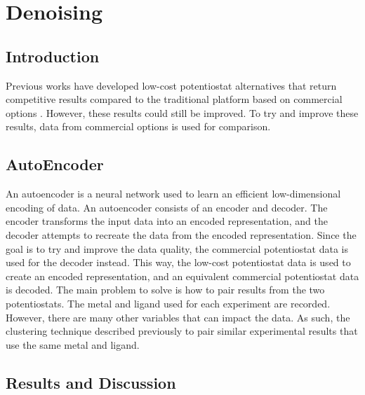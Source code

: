 \chapter{Denoising} \label{chap:chap-4}

\section{Introduction}
Previous works have developed low-cost potentiostat alternatives that return competitive results compared to the traditional platform based on commercial options \cite{PabloGarca2024}. However, these results could still be improved. To try and improve these results, data from commercial options is used for comparison. 
\section{AutoEncoder}
An autoencoder is a neural network used to learn an efficient low-dimensional encoding of data. An autoencoder consists of an encoder and decoder. The encoder transforms the input data into an encoded representation, and the decoder attempts to recreate the data from the encoded representation. Since the goal is to try and improve the data quality, the commercial potentiostat data is used for the decoder instead. This way, the low-cost potentiostat data is used to create an encoded representation, and an  equivalent commercial potentiostat data is decoded. The main problem to solve is how to pair results from the two potentiostats. The metal and ligand used for each experiment are recorded. However, there are many other variables that can impact the data. As such, the clustering technique described previously to pair similar experimental results that use the same metal and ligand. 
\section{Results and Discussion}

